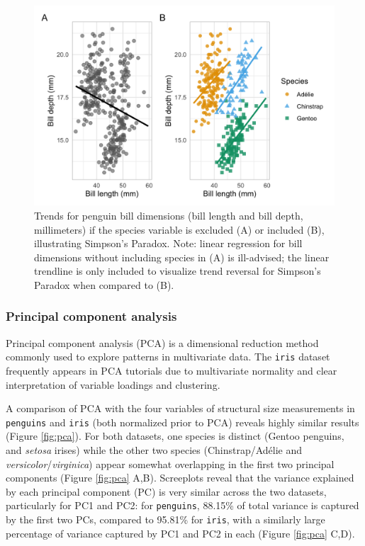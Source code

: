 \begin{Schunk}
\begin{figure}

{\centering \includegraphics{figs/simpsons-1} 

}

\caption[Trends for penguin bill dimensions (bill length and bill depth, millimeters) if the species variable is excluded (A) or included (B), illustrating Simpson’s Paradox]{Trends for penguin bill dimensions (bill length and bill depth, millimeters) if the species variable is excluded (A) or included (B), illustrating Simpson’s Paradox. Note: linear regression for bill dimensions without including species in (A) is ill-advised; the linear trendline is only included to visualize trend reversal for Simpson’s Paradox when compared to (B).}\label{fig:simpsons}
\end{figure}
\end{Schunk}

\hypertarget{principal-component-analysis}{%
\subsubsection{Principal component
analysis}\label{principal-component-analysis}}

Principal component analysis (PCA) is a dimensional reduction method
commonly used to explore patterns in multivariate data. The
\texttt{iris} dataset frequently appears in PCA tutorials due to
multivariate normality and clear interpretation of variable loadings and
clustering.

A comparison of PCA with the four variables of structural size
measurements in \texttt{penguins} and \texttt{iris} (both normalized
prior to PCA) reveals highly similar results (Figure \ref{fig:pca}). For
both datasets, one species is distinct (Gentoo penguins, and
\emph{setosa} irises) while the other two species (Chinstrap/Adélie and
\emph{versicolor}/\emph{virginica}) appear somewhat overlapping in the
first two principal components (Figure \ref{fig:pca} A,B). Screeplots
reveal that the variance explained by each principal component (PC) is
very similar across the two datasets, particularly for PC1 and PC2: for
\texttt{penguins}, 88.15\% of total variance is captured by the first
two PCs, compared to 95.81\% for \texttt{iris}, with a similarly large
percentage of variance captured by PC1 and PC2 in each (Figure
\ref{fig:pca} C,D).

